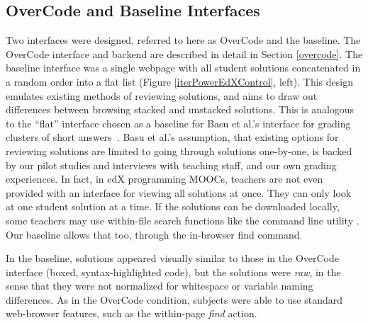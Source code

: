 \subsection{OverCode and Baseline Interfaces}

Two interfaces were designed, referred to here as OverCode and the baseline. The OverCode interface and backend are described in detail in Section \ref{overcode}. The baseline interface was a single webpage with all student solutions concatenated in a random order into a flat list (Figure \ref{iterPowerEdXControl}, left). This design emulates existing methods of reviewing solutions, and aims to draw out differences between browsing stacked and unstacked solutions. This is analogous to the ``flat'' interface chosen as a baseline for Basu et al.'s interface for grading clusters of short answers~\cite{basuDivideAndConquer}. Basu et al.'s assumption, that existing options for reviewing solutions are limited to going through solutions one-by-one, is backed by our pilot studies and interviews with teaching staff, and our own grading experiences. In fact, in edX programming MOOCs, teachers are not even provided with an interface for viewing all solutions at once. They can only look at one student solution at a time. If the solutions can be downloaded locally, some teachers may use within-file search functions like the command line utility . Our baseline allows that too, through the in-browser find command. 

In the baseline, solutions appeared visually similar to those in the OverCode interface (boxed, syntax-highlighted code), but the solutions were \emph{raw}, in the sense that they were not normalized for whitespace or variable naming differences. As in the OverCode condition, subjects were able to use standard web-browser features, such as the within-page \emph{find} action.


